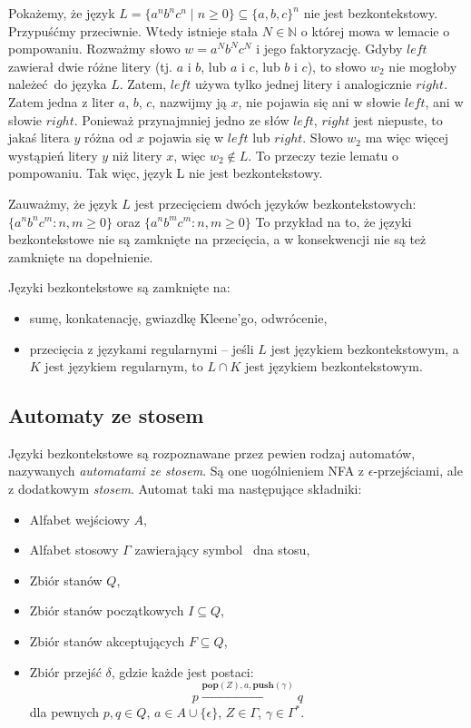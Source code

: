 \begin{example}
    Pokażemy, że język $L = \{ a^n b^n c^n \mid n \geq 0 \} \subseteq \{a, b, c\}^n$
    nie jest bezkontekstowy. Przypuśćmy przeciwnie. Wtedy istnieje stała $N \in \mathbb{N}$ o której mowa w lemacie o pompowaniu. 
    Rozważmy słowo $w = a^N b^N c^N$ i jego faktoryzację.
    Gdyby $left$ zawierał dwie różne litery 
    (tj. $a$ i $b$, lub $a$ i $c$, lub $b$ i $c$), to słowo $w_2$ nie mogłoby
    należeć do języka $L$. Zatem, $left$ używa tylko jednej litery i analogicznie $right$. 
    Zatem jedna z liter $a$, $b$, $c$, nazwijmy ją $x$, 
    nie pojawia się ani w słowie $left$, ani w słowie $right$. 
    Ponieważ przynajmniej jedno ze słów $left$, $right$ jest niepuste, 
    to jakaś litera $y$ różna od $x$ pojawia się w $left$ lub $right$. 
    Słowo $w_2$ ma więc więcej wystąpień litery $y$ niż litery $x$, 
    więc $w_2 \notin L$. To przeczy tezie lematu o pompowaniu. Tak
    więc, język L nie jest bezkontekstowy.

    Zauważmy, że język $L$ jest przecięciem dwóch języków bezkontekstowych:
    $\{ a^n b^n c^m : n, m \geq 0 \}$ oraz 
    $\{ a^n b^m c^m : n, m \geq 0 \}$
    To przykład na to, że języki bezkontekstowe nie są zamknięte na przecięcia,
    a w konsekwencji nie są też zamknięte na dopełnienie.
\end{example}

Języki bezkontekstowe są zamknięte na:
\begin{itemize}
    \item sumę, konkatenację, gwiazdkę Kleene'go, odwrócenie,
    \item przecięcia z językami regularnymi -- jeśli $L$ jest językiem bezkontekstowym, a $K$ jest językiem regularnym,
    to $L \cap K$ jest językiem bezkontekstowym.
\end{itemize}

\subsection{Automaty ze stosem}
Języki bezkontekstowe są rozpoznawane przez pewien rodzaj automatów, nazywanych \textit{automatami ze stosem}. Są one uogólnieniem NFA z $\epsilon$-przejściami, ale z dodatkowym \textit{stosem}. Automat taki ma następujące składniki:
\begin{itemize}
    \item Alfabet wejściowy $A$,
    \item Alfabet stosowy $\Gamma$ zawierający symbol \ dna stosu,
    \item Zbiór stanów $Q$,
    \item Zbiór stanów początkowych $I \subseteq Q$,
    \item Zbiór stanów akceptujących $F \subseteq Q$,
    \item Zbiór przejść $\delta$, gdzie każde jest postaci:
    \[
    p \xrightarrow{ \textbf{pop}(Z),a,\textbf{push}(\gamma) } q
    \]
    dla pewnych $p,q \in Q$, $a \in A \cup \{\epsilon\}$, $Z \in \Gamma$, $\gamma \in \Gamma^*$.
\end{itemize}

